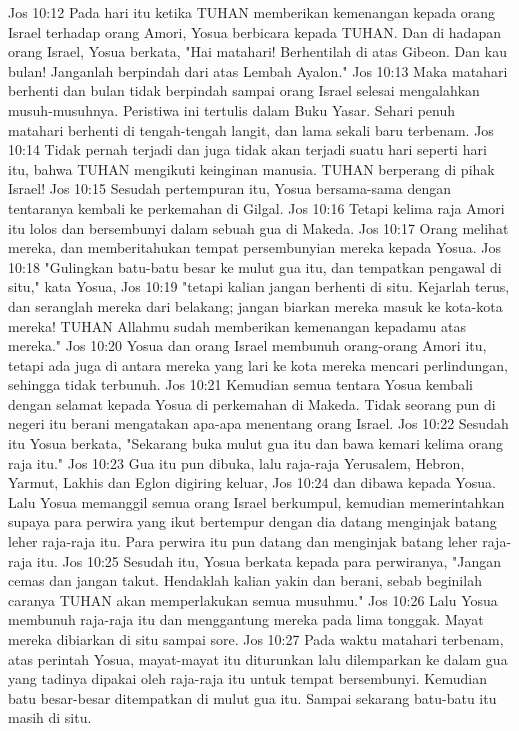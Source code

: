 Jos 10:12  Pada hari itu ketika TUHAN memberikan kemenangan kepada orang Israel terhadap orang Amori, Yosua berbicara kepada TUHAN. Dan di hadapan orang Israel, Yosua berkata, "Hai matahari! Berhentilah di atas Gibeon. Dan kau bulan! Janganlah berpindah dari atas Lembah Ayalon."
Jos 10:13  Maka matahari berhenti dan bulan tidak berpindah sampai orang Israel selesai mengalahkan musuh-musuhnya. Peristiwa ini tertulis dalam Buku Yasar. Sehari penuh matahari berhenti di tengah-tengah langit, dan lama sekali baru terbenam.
Jos 10:14  Tidak pernah terjadi dan juga tidak akan terjadi suatu hari seperti hari itu, bahwa TUHAN mengikuti keinginan manusia. TUHAN berperang di pihak Israel!
Jos 10:15  Sesudah pertempuran itu, Yosua bersama-sama dengan tentaranya kembali ke perkemahan di Gilgal.
Jos 10:16  Tetapi kelima raja Amori itu lolos dan bersembunyi dalam sebuah gua di Makeda.
Jos 10:17  Orang melihat mereka, dan memberitahukan tempat persembunyian mereka kepada Yosua.
Jos 10:18  "Gulingkan batu-batu besar ke mulut gua itu, dan tempatkan pengawal di situ," kata Yosua,
Jos 10:19  "tetapi kalian jangan berhenti di situ. Kejarlah terus, dan seranglah mereka dari belakang; jangan biarkan mereka masuk ke kota-kota mereka! TUHAN Allahmu sudah memberikan kemenangan kepadamu atas mereka."
Jos 10:20  Yosua dan orang Israel membunuh orang-orang Amori itu, tetapi ada juga di antara mereka yang lari ke kota mereka mencari perlindungan, sehingga tidak terbunuh.
Jos 10:21  Kemudian semua tentara Yosua kembali dengan selamat kepada Yosua di perkemahan di Makeda. Tidak seorang pun di negeri itu berani mengatakan apa-apa menentang orang Israel.
Jos 10:22  Sesudah itu Yosua berkata, "Sekarang buka mulut gua itu dan bawa kemari kelima orang raja itu."
Jos 10:23  Gua itu pun dibuka, lalu raja-raja Yerusalem, Hebron, Yarmut, Lakhis dan Eglon digiring keluar,
Jos 10:24  dan dibawa kepada Yosua. Lalu Yosua memanggil semua orang Israel berkumpul, kemudian memerintahkan supaya para perwira yang ikut bertempur dengan dia datang menginjak batang leher raja-raja itu. Para perwira itu pun datang dan menginjak batang leher raja-raja itu.
Jos 10:25  Sesudah itu, Yosua berkata kepada para perwiranya, "Jangan cemas dan jangan takut. Hendaklah kalian yakin dan berani, sebab beginilah caranya TUHAN akan memperlakukan semua musuhmu."
Jos 10:26  Lalu Yosua membunuh raja-raja itu dan menggantung mereka pada lima tonggak. Mayat mereka dibiarkan di situ sampai sore.
Jos 10:27  Pada waktu matahari terbenam, atas perintah Yosua, mayat-mayat itu diturunkan lalu dilemparkan ke dalam gua yang tadinya dipakai oleh raja-raja itu untuk tempat bersembunyi. Kemudian batu besar-besar ditempatkan di mulut gua itu. Sampai sekarang batu-batu itu masih di situ.
